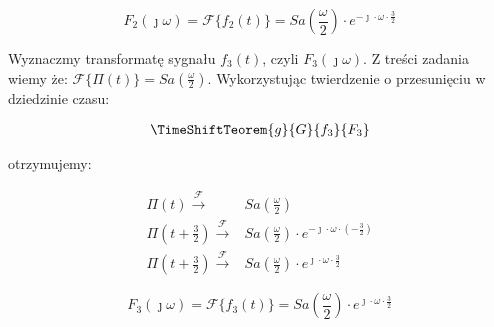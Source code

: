 \begin{task}

\begin{equation}
F_{2}(\jmath \omega) = \mathcal F\{f_{2}(t)\} = Sa\left(\frac{\omega}{2}\right) \cdot e^{-\jmath \cdot \omega \cdot \frac{3}{2}}
\end{equation}

Wyznaczmy transformatę sygnału $f_3(t)$, czyli $F_3\left(\jmath\omega\right)$.
Z treści zadania wiemy że: $\mathcal F \{\Pi(t)\} = Sa\left(\frac{\omega}{2}\right)$.
Wykorzystując twierdzenie o przesunięciu w dziedzinie czasu:

\begin{align*}
\TimeShiftTeorem{g}{G}{f_3}{F_3}
\end{align*}

otrzymujemy:

\begin{align*}
\Pi(t) \xrightarrow{\mathcal F} & Sa\left(\frac{\omega}{2}\right)\\
\Pi\left(t+\frac{3}{2}\right) \xrightarrow{\mathcal F} & Sa\left(\frac{\omega}{2}\right) \cdot e^{-\jmath \cdot \omega \cdot \left(-\frac{3}{2}\right)}\\
\Pi\left(t+\frac{3}{2}\right) \xrightarrow{\mathcal F} & Sa\left(\frac{\omega}{2}\right) \cdot e^{\jmath \cdot \omega \cdot \frac{3}{2}}
\end{align*}


\begin{equation}
F_{3}(\jmath \omega) = \mathcal F\{f_{3}(t)\} = Sa\left(\frac{\omega}{2}\right) \cdot e^{\jmath \cdot \omega \cdot \frac{3}{2}}
\end{equation}



\end{task}
